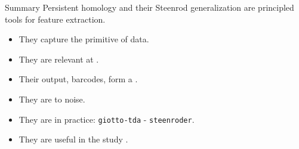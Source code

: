 \begin{frame}{Summary}
	Persistent homology and their Steenrod generalization are principled tools for feature extraction.

	\pause\medskip
	\begin{itemize}
		\itemsep15pt %
		\item They capture the primitive  of data.

		\item They are relevant at .

		\item Their output, barcodes, form a .

		\item They are  to noise.

		\item They are  in practice: \texttt{giotto-tda} - \texttt{steenroder}.

		\item They are useful in the study .
	\end{itemize}
\end{frame}